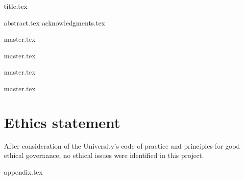 \documentclass[a4paper, 12pt]{report}
\begin{document}
{title.tex}



\setcounter{tocdepth}{4}




{abstract.tex}
{acknowledgments.tex}


\tableofcontents

\newpage

\listoffigures

\newpage

\listoftables


% 

\printglossary[type=acronym]




\newpage



{master.tex}


{master.tex}


{master.tex}



{master.tex}


\chapter{Ethics statement}

After consideration of the University's code of practice and principles for good ethical governance, no ethical issues were identified in this project. 


{appendix.tex}





\end{document}
